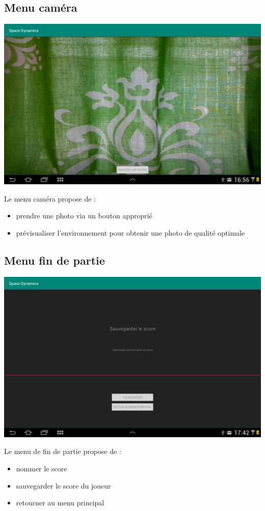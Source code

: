 \documentclass{article}
\begin{document}
\subsection{Menu caméra}
\begin{center}
\includegraphics[scale=0.25]{CameraActivity.png}
\end{center}
Le menu caméra propose de :
\begin{itemize}
\item prendre une photo via un bouton approprié
\item prévisualiser l’environnement pour obtenir une photo de qualité optimale
\end{itemize}

\subsection{Menu fin de partie}
\begin{center}
\includegraphics[scale=0.25]{EndGameActivity.png}
\end{center}
Le menu de fin de partie propose de :
\begin{itemize}
\item nommer le score
\item sauvegarder le score du joueur 
\item retourner au menu principal
\end{itemize}
\end{document}
